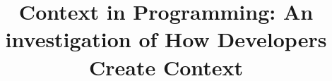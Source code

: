 \documentclass[sigconf,anonymous]{acmart}
\begin{document}
\title{Context in Programming: An investigation of How Developers Create Context}









\renewcommand{\shortauthors}{S. Chattopadhyay et al.}
\end{document}

